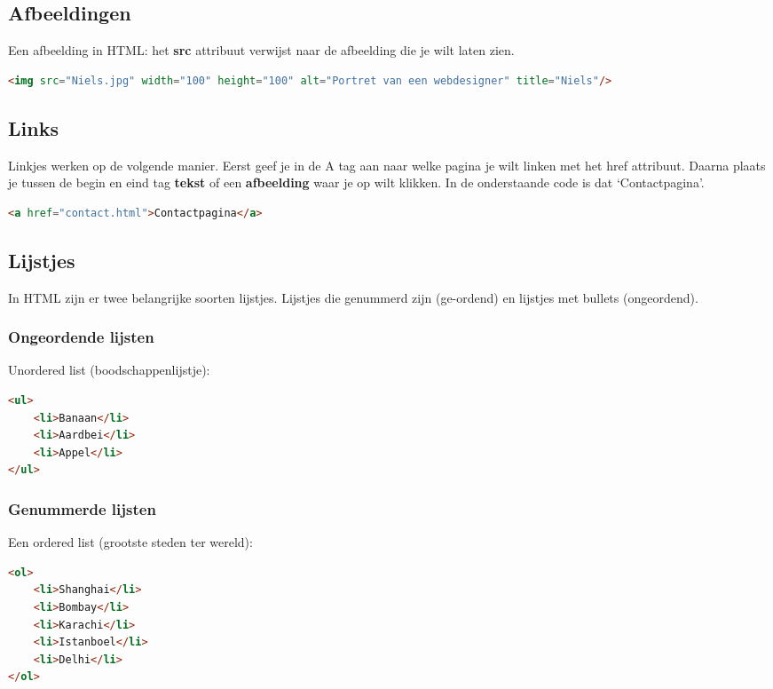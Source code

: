 \documentclass[8pt,pagesize,footinclude=false,headinclude=false]{scrartcl}
\begin{document}
\begin{multicols*}{4}
\subsection*{Afbeeldingen}
Een afbeelding in HTML: het \textbf{src} attribuut verwijst naar de afbeelding die je wilt laten zien.
\begin{lstlisting}[language=HTML]
<img src="Niels.jpg" width="100" height="100" alt="Portret van een webdesigner" title="Niels"/>
\end{lstlisting}

\subsection*{Links}
Linkjes werken op de volgende manier. Eerst geef je in de A tag aan naar welke pagina je wilt linken met het href attribuut. Daarna plaats je tussen de begin en eind tag \textbf{tekst} of een \textbf{afbeelding} waar je op wilt klikken. In de onderstaande code is dat `Contactpagina'.

\begin{lstlisting}[language=HTML]
<a href="contact.html">Contactpagina</a>
\end{lstlisting}

\subsection*{Lijstjes}
In HTML zijn er twee belangrijke soorten lijstjes. Lijstjes die genummerd zijn (ge-ordend) en lijstjes met bullets (ongeordend).

\subsubsection*{Ongeordende lijsten}
Unordered list (boodschappenlijstje): 
\begin{lstlisting}[language=HTML]
<ul>
	<li>Banaan</li>
	<li>Aardbei</li>
	<li>Appel</li>
</ul>
\end{lstlisting}

\subsubsection*{Genummerde lijsten}
Een ordered list (grootste steden ter wereld):
\begin{lstlisting}[language=HTML]
<ol>
	<li>Shanghai</li>
	<li>Bombay</li>
	<li>Karachi</li>
	<li>Istanboel</li>
	<li>Delhi</li>
</ol>
\end{lstlisting}


\end{multicols*}
\end{document}
